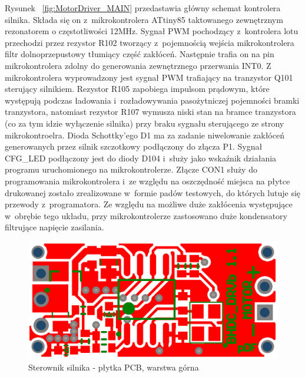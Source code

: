 \documentclass[11pt, twoside]{Thesis} %
\begin{document}
Rysunek ~\ref{fig:MotorDriver_MAIN} przedastawia główny schemat kontrolera silnika. Składa się on z~mikrokontrolera ATtiny85 taktowanego zewnętrznym rezonatorem o częstotliwości 12MHz. Sygnał PWM pochodzący z~kontrolera lotu przechodzi przez rezystor R102 tworzący z~pojemnością wejścia mikrokontrolera filtr dolnoprzepustowy tłumiący część zakłóceń. Następnie trafia on na pin mikrokontrolera zdolny do generowania zewnętrznego przerwania INT0. Z mikrokontrolera wyprowadzony jest sygnał PWM  trafiający na tranzystor Q101 sterujący silnikiem. Rezystor R105 zapobiega impulsom prądowym, które występują podczas ładowania i~rozładowywania pasożytniczej pojemności bramki tranzystora, natomiast rezystor R107 wymusza niski stan na bramce tranzystora (co za tym idzie wyłączenie silnika) przy braku sygnału sterującego ze strony mikrokontroelra. Dioda Schottky'ego D1 ma za zadanie niwelowanie zakłóceń generowanych przez silnik szczotkowy podłączony do złącza P1. Sygnał CFG\_LED podłączony jest do diody D104 i~służy jako wskaźnik działania programu uruchomionego na mikrokontrolerze. Złącze CON1 służy do programowania mikrokontrolera i~ze względu na oszczędność miejsca na płytce drukowanej zostało zrealizowane w~formie padów testowych, do których lutuje się przewody z~programatora. Ze względu na możliwe duże zakłócenia występujące w~obrębie tego układu, przy mikrokontrolerze zastosowano duże kondensatory filtrujące napięcie zasilania.

\begin{figure}[H]
	\centering
	\includegraphics[scale=0.4]{Pictures/MotorDriverPCB_Top.png}
		\caption[Sterownik silnika - płytka PCB, warstrwa górna]{Sterownik silnika - płytka PCB, warstwa górna}
	\label{fig:MotorDriverPCB_Top}
\end{figure}
\end{document}
